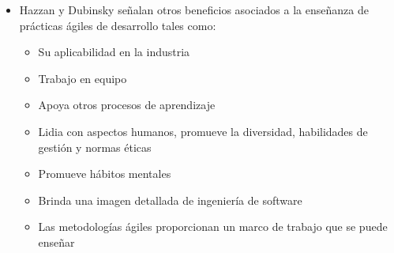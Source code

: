 \documentclass[journal]{IEEEtran}
\begin{document}
\begin{itemize}
    \item Hazzan y Dubinsky \cite{hazzan-dubinsky} señalan otros beneficios asociados a la enseñanza de prácticas ágiles de desarrollo tales como:
    \begin{itemize}
        \item Su aplicabilidad en la industria
        \item Trabajo en equipo
        \item Apoya otros procesos de aprendizaje
        \item Lidia con aspectos humanos, promueve la diversidad, habilidades de gestión y normas éticas
        \item Promueve hábitos mentales
        \item Brinda una imagen detallada de ingeniería de software
        \item Las metodologías ágiles proporcionan un marco de trabajo que se puede enseñar
    \end{itemize}
\end{itemize}
\end{document}
